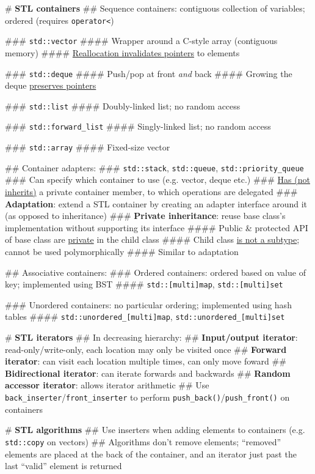 \documentclass[11pt, oneside]{article}
\begin{document}
# \textbf{STL containers}
## Sequence containers: contiguous collection of variables; ordered (requires \texttt{operator<})

### \texttt{std::vector}
#### Wrapper around a C-style array (contiguous memory)
#### \underline{Reallocation invalidates pointers} to elements

### \texttt{std::deque}
#### Push/pop at front \emph{and} back
#### Growing the deque \underline{preserves pointers}

### \texttt{std::list}
#### Doubly-linked list; no random access

### \texttt{std::forward\_list}
#### Singly-linked list; no random access

### \texttt{std::array}
#### Fixed-size vector

## Container adapters: 
### \texttt{std::stack}, \texttt{std::queue}, \texttt{std::priority\_queue}
### Can specify which container to use (e.g. vector, deque etc.)
### \underline{Has (not inherits)} a private container member, to which operations are delegated
### \textbf{Adaptation}: extend a STL container by creating an adapter interface around it (as opposed to inheritance)
### \textbf{Private inheritance}: reuse base class's implementation without supporting its interface
#### Public \& protected API of base class are \underline{private} in the child class
#### Child class \underline{is not a subtype}; cannot be used polymorphically
#### Similar to adaptation

## Associative containers:
### Ordered containers: ordered based on value of key; implemented using BST
#### \texttt{std::[multi]map}, \texttt{std::[multi]set}

### Unordered containers: no particular ordering; implemented using hash tables
#### \texttt{std::unordered\_[multi]map}, \texttt{std::unordered\_[multi]set}

# \textbf{STL iterators}
## In decreasing hierarchy: 
## \textbf{Input/output iterator}: read-only/write-only, each location may only be visited once
## \textbf{Forward iterator}: can visit each location multiple times, can only move foward
## \textbf{Bidirectional iterator}: can iterate forwards and backwards
## \textbf{Random accessor iterator}: allows iterator arithmetic
## Use \texttt{back\_inserter}/\texttt{front\_inserter} to perform \texttt{push\_back()}/\texttt{push\_front()} on containers

# \textbf{STL algorithms}
## Use inserters when adding elements to containers (e.g. \texttt{std::copy} on vectors)
## Algorithms don't remove elements; ``removed'' elements are placed at the back of the container, and an iterator just past the last ``valid'' element is returned
\end{document}

